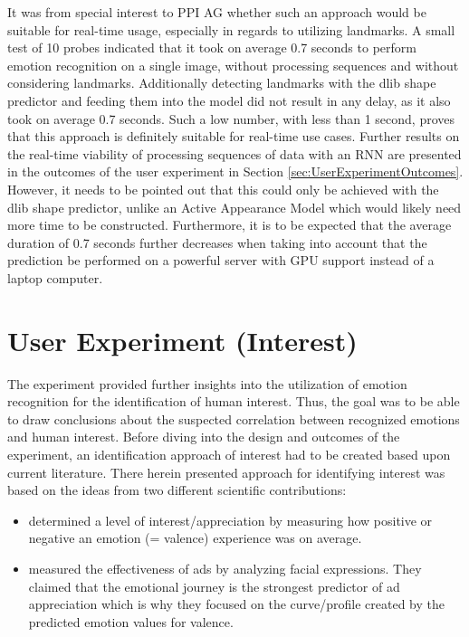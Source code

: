 \noindent It was from special interest to PPI AG whether such an approach would be suitable for real-time usage, especially in regards to utilizing landmarks. A small test of 10 probes indicated that it took on average 0.7 seconds to perform emotion recognition on a single image, without processing sequences and without considering landmarks. Additionally detecting landmarks with the dlib shape predictor \citep{Kazemi:2014:ShapePredictor} and feeding them into the model did not result in any delay, as it also took on average 0.7 seconds. Such a low number, with less than 1 second, proves that this approach is definitely suitable for real-time use cases. Further results on the real-time viability of processing sequences of data with an RNN are presented in the outcomes of the user experiment in Section \ref{sec:UserExperimentOutcomes}.
\newline\newline
However, it needs to be pointed out that this could only be achieved with the dlib shape predictor, unlike an Active Appearance Model which would likely need more time to be constructed. Furthermore, it is to be expected that the average duration of 0.7 seconds further decreases when taking into account that the prediction be performed on a powerful server with GPU support instead of a laptop computer.

\section{User Experiment (Interest)}
The experiment provided further insights into the utilization of emotion recognition for the identification of human interest. Thus, the goal was to be able to draw conclusions about the suspected correlation between recognized emotions and human interest. Before diving into the design and outcomes of the experiment, an identification approach of interest had to be created based upon current literature.
\newline\newline
There herein presented approach for identifying interest was based on the ideas from two different scientific contributions:
\begin{itemize}
    \item \citet{Kamaruddin:2016:MeasuringCustomerSatisfaction} determined a level of interest/appreciation by measuring how positive or negative an emotion (= valence) experience was on average.
    \item \citet{Poirier:2016:AdsFacialExpression} measured the effectiveness of ads by analyzing facial expressions. They claimed that the emotional journey is the strongest predictor of ad appreciation which is why they focused on the curve/profile created by the predicted emotion values for valence.
\end{itemize}


